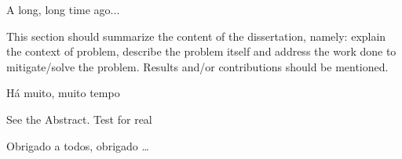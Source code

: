


A long, long time ago... 

This section should summarize the content of the dissertation, namely: explain the context of problem, describe the problem itself and address the work done to mitigate/solve the problem. Results and/or contributions should be mentioned.

Há muito, muito tempo

See the Abstract.
Test for real


Obrigado a todos, obrigado \ldots
